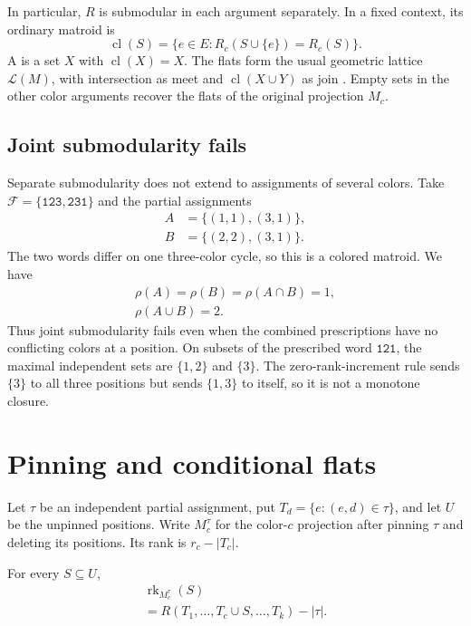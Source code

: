 In particular, $R$ is submodular in each argument separately. In a
fixed context, its ordinary matroid  is
\[
 \operatorname{cl}(S)=
 \{e\in E:R_c(S\cup\{e\})=R_c(S)\}.
\]
A  is a set $X$ with $\operatorname{cl}(X)=X$.
The flats form the usual geometric lattice $\mathcal L(M)$, with
intersection as meet and $\operatorname{cl}(X\cup Y)$ as join
\cite{Oxley2011}. Empty sets in the other color arguments recover
the flats of the original projection $M_c$.

\subsection[jointSubmodularity]{Joint submodularity fails}

Separate submodularity does not extend to assignments of several colors.
Take $\mathcal F=\{\mathtt{123},\mathtt{231}\}$ and the partial assignments
\[
 \begin{aligned}
 A&=\{(1,1),(3,1)\},\\
 B&=\{(2,2),(3,1)\}.
 \end{aligned}
\]
The two words differ on one three-color cycle, so this is a colored
matroid. We have
\[
 \begin{gathered}
 \rho(A)=\rho(B)=\rho(A\cap B)=1,\\
 \rho(A\cup B)=2.
 \end{gathered}
\]
Thus joint submodularity fails even when the combined prescriptions
have no conflicting colors at a position. On subsets of the prescribed
word $\mathtt{121}$, the maximal independent sets are $\{1,2\}$ and
$\{3\}$. The zero-rank-increment rule sends $\{3\}$ to all three
positions but sends $\{1,3\}$ to itself, so it is not a monotone closure.

\section[conditionalRankFlats]{Pinning and conditional flats}

Let $\tau$ be an independent partial assignment, put
$T_d=\{e:(e,d)\in\tau\}$, and let $U$ be the unpinned positions.
Write $M_c^\tau$ for the color-$c$ projection after pinning $\tau$
and deleting its positions. Its rank is $r_c-|T_c|$.

\begin{theorem}
For every $S\subseteq U$,
\[
 \begin{gathered}
 \operatorname{rk}_{M_c^\tau}(S)\\
 =R(T_1,\dotsc,T_c\cup S,\dotsc,T_k)-|\tau|.
 \end{gathered}
\]
\end{theorem}

